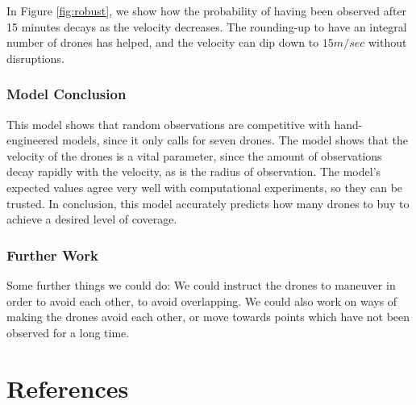 \documentclass{article}
\begin{document}
In Figure \ref{fig:robust}, we show how the probability of having been
	observed after 15 minutes decays as the velocity decreases.
The rounding-up to have an integral number of drones has helped, and the
	velocity can dip down to $15 m/sec$ without disruptions.

\subsubsection{Model Conclusion}

This model shows that random observations are competitive with hand-engineered
	models, since it only calls for seven drones.
The model shows that the velocity of the drones is a vital parameter,
	since the amount of observations decay rapidly with the velocity, 
	as is the radius of observation.
The model's expected values agree very well with computational experiments,
	so they can be trusted.
In conclusion, this model accurately predicts how many drones to buy to achieve
	a desired level of coverage.

\subsubsection{Further Work}

Some further things we could do:
We could instruct the drones to maneuver in order to avoid each other,
	to avoid overlapping.
We could also work on ways of making the drones avoid each other,
	or move towards points which have not been observed for a long time.

\section{References}
\end{document}
